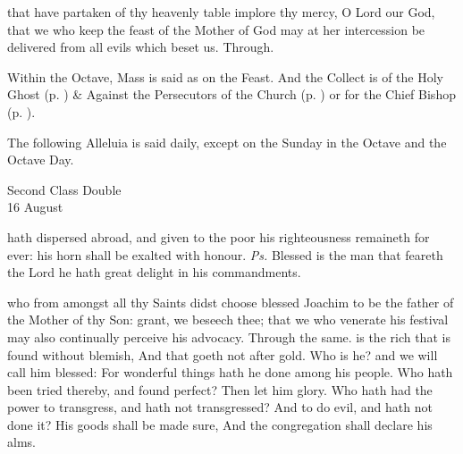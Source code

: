 
\vspace{-1.5ex}

\postcommunion
{} that have partaken of thy heavenly table implore thy mercy, O Lord our God, that we who keep the feast of the Mother of God may at her intercession be delivered from all evils which beset us. Through.

\begin{rubric}
    Within the Octave, Mass is said as on the Feast. And the  Collect is of the Holy Ghost (p. \pageref{SPHolyGhost}) \&  Against the Persecutors of the Church (p. \pageref{SPAgainst}) or for the Chief Bishop (p. \pageref{SPChiefBishop}).
\end{rubric}
\begin{rubric}
    The following Alleluia is said daily, except on the Sunday in the Octave and the Octave Day.
\end{rubric}

\begin{inhead}
    {Second Class Double\\
16 August}
\end{inhead}

\introit
{} hath dispersed abroad, and given to the poor his righteousness remaineth for ever: his horn shall be exalted with honour. \textit{Ps.} Blessed is the man that feareth the Lord he hath great delight in his commandments.

\collect
{} who from amongst all thy Saints didst choose blessed Joachim to be the father of the Mother of thy Son: grant, we beseech thee; that we who venerate his festival may also continually perceive his advocacy. Through the same.
 is the rich that is found without blemish, And that goeth not after gold. Who is he? and we will call him blessed: For wonderful things hath he done among his people. Who hath been tried thereby, and found perfect? Then let him glory. Who hath had the power to transgress, and hath not transgressed? And to do evil, and hath not done it? His goods shall be made sure, And the congregation shall declare his alms.

